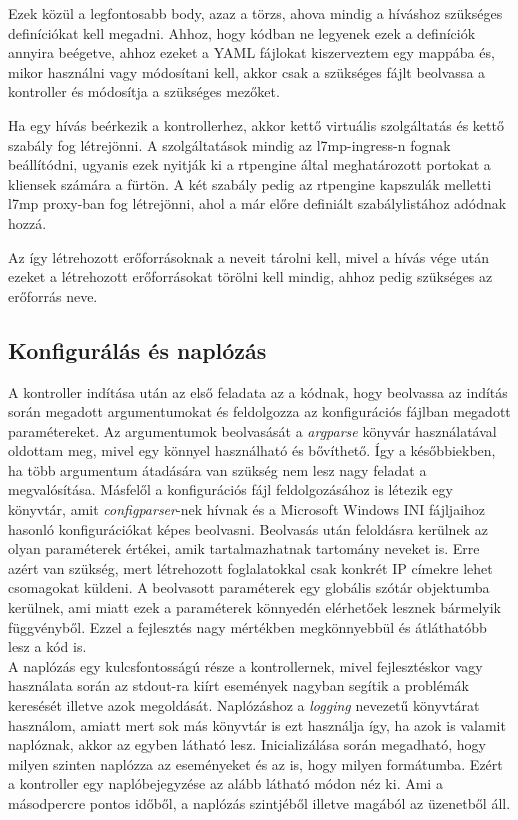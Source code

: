 Ezek közül a legfontosabb body, azaz a törzs, ahova mindig a híváshoz szükséges definíciókat
kell megadni. Ahhoz, hogy kódban ne legyenek ezek a definíciók annyira beégetve, ahhoz
ezeket a YAML fájlokat kiszerveztem egy mappába és, mikor használni vagy módosítani kell,
akkor csak a szükséges fájlt beolvassa a kontroller és módosítja a szükséges mezőket.

Ha egy hívás beérkezik a kontrollerhez, akkor kettő virtuális szolgáltatás és kettő
szabály fog létrejönni. A szolgáltatások mindig az l7mp-ingress-n fognak beállítódni, 
ugyanis ezek nyitják ki a rtpengine által meghatározott portokat a kliensek számára
a fürtön. A két szabály pedig az rtpengine kapszulák melletti l7mp proxy-ban 
fog létrejönni, ahol a már előre definiált szabálylistához adódnak hozzá. 

Az így létrehozott erőforrásoknak a neveit tárolni kell, mivel a hívás vége után ezeket
a létrehozott erőforrásokat törölni kell mindig, ahhoz pedig szükséges az erőforrás 
neve. 

\subsection{Konfigurálás és naplózás}

A kontroller indítása után az első feladata az a kódnak, hogy beolvassa az indítás
során megadott argumentumokat és feldolgozza az konfigurációs fájlban megadott 
paramétereket. Az argumentumok beolvasását a \textit{argparse} könyvár használatával
oldottam meg, mivel egy könnyel használható és bővíthető. Így a későbbiekben, ha 
több argumentum átadására van szükség nem lesz nagy feladat a megvalósítása. Másfelől
a konfigurációs fájl feldolgozásához is létezik egy könyvtár, amit \textit{configparser}-nek
hívnak és a Microsoft Windows INI fájljaihoz hasonló konfigurációkat képes beolvasni. Beolvasás
után feloldásra kerülnek az olyan paraméterek értékei, amik tartalmazhatnak tartomány neveket
is. Erre azért van szükség, mert létrehozott foglalatokkal csak konkrét IP címekre lehet 
csomagokat küldeni. A beolvasott paraméterek egy globális szótár objektumba kerülnek, ami 
miatt ezek a paraméterek könnyedén elérhetőek lesznek bármelyik függvényből. Ezzel a fejlesztés
nagy mértékben megkönnyebbül és átláthatóbb lesz a kód is. \\

A naplózás egy kulcsfontosságú része a kontrollernek, mivel fejlesztéskor vagy használata
során az stdout-ra kiírt események nagyban segítik a problémák keresését illetve azok 
megoldását. Naplózáshoz a \textit{logging} nevezetű könyvtárat használom, amiatt mert 
sok más könyvtár is ezt használja így, ha azok is valamit naplóznak, akkor az egyben 
látható lesz. Inicializálása során megadható, hogy milyen szinten naplózza az eseményeket 
és az is, hogy milyen formátumba. Ezért a kontroller egy naplóbejegyzése az alább látható 
módon néz ki. Ami a másodpercre pontos időből, a naplózás szintjéből illetve magából az 
üzenetből áll.

